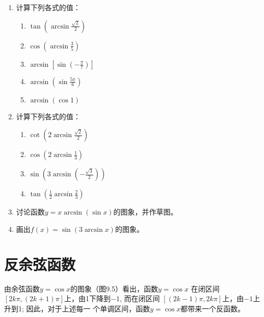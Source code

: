 \begin{enumerate}
\item 计算下列各式的值：
\begin{multicols}{2}
    \begin{enumerate}
        \item $\tan\left(\arcsin\frac{\sqrt{2}}{2}\right)$
        \item $\cos\left(\arcsin \frac{3}{5}\right)$
        \item $\arcsin \left[\sin\left(-\frac{\pi}{7}\right)\right]$
        \item $\arcsin\left(\sin\frac{5\pi}{6}\right)$
        \item $\arcsin(\cos1)$
    \end{enumerate}
    \end{multicols}
    \item 计算下列各式的值：
\begin{multicols}{2}
    \begin{enumerate}
        \item $\cot\left(2\arcsin\frac{\sqrt{2}}{2}\right)$
        \item $\cos\left(2\arcsin\frac{1}{3}\right)$
        \item $\sin\left(3\arcsin\left(-\frac{\sqrt{3}}{2}\right)\right)$
        \item $\tan\left(\frac{1}{2}\arcsin\frac{2}{3}\right)$
    \end{enumerate}
    \end{multicols}

    \item 讨论函数$y=x \arcsin(\sin x)$的图象，并作草图。
\item 画出$f(x)=\sin(3\arcsin x)$的图象。
\end{enumerate}

\section{反余弦函数}
由余弦函数$y=\cos x$的图象（图9.5）看出，函数$y=\cos x$
在闭区间$[2k\pi ,(2k+1)\pi ]$上，由1下降到$-1$, 而在闭区间
$[(2k-1)\pi ,2k\pi]$上，由$-1$上升到1; 因此，对于上述每一
个单调区间，函数$y=\cos x$都带来一个反函数。

\begin{figure}[htp]
    \centering
{}
    \caption{}
\end{figure}

